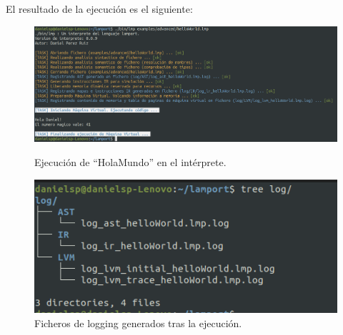 \noindent
El resultado de la ejecución es el siguiente:
\begin{figure}[h]
  \begin{minipage}{\linewidth}
    \centering
    \includegraphics[width=\linewidth]{images/implementacion/ejecucion/lmp_hola_mundo.png}
    \caption{Ejecución de ``HolaMundo'' en el intérprete.}
    \label{fig:ejecucionHolaMundo}
  \end{minipage}
  \vspace{10pt} 
  \begin{minipage}{\linewidth}
    \centering
    \includegraphics[width=\linewidth]{images/implementacion/ejecucion/logs.png}
    \caption{Ficheros de logging generados tras la ejecución.}
    \label{fig:logsHolaMundo}
  \end{minipage}
\end{figure}

\newpage

